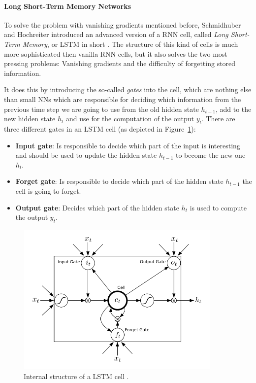 \paragraph{Long Short-Term Memory Networks} To solve the problem with vanishing gradients mentioned before, Schmidhuber and Hochreiter introduced an advanced version of a RNN cell, called \emph{Long Short-Term Memory}, or LSTM in short \cite{Hochreiter:1997}. The structure of this kind of cells is much more sophisticated then vanilla RNN cells, but it also solves the two most pressing problems: Vanishing gradients and the difficulty of forgetting stored information.

It does this by introducing the so-called \emph{gates} into the cell, which are nothing else than small NNs which are responsible for deciding which information from the previous time step we are going to use from the old hidden state $h_{t-1}$, add to the new hidden state $h_t$ and use for the computation of the output $y_t$. There are three different gates in an LSTM cell (as depicted in Figure~\ref{fundamentals:lstm:internal_structure}):

\begin{itemize}
	\item \textbf{Input gate}: Is responsible to decide which part of the input is interesting and should be used to update the hidden state $h_{t-1}$ to become the new one $h_t$.
	\item \textbf{Forget gate}: Is responsible to decide which part of the hidden state $h_{t-1}$ the cell is going to forget.
	\item \textbf{Output gate}: Decides which part of the hidden state $h_t$ is used to compute the output $y_t$.
\end{itemize}

\begin{figure}[h]
	\centering
	\includegraphics[width=10cm]{img/lstm_internal}
	\caption{Internal structure of a LSTM cell \cite{Graves:2013}.}
	\label{fundamentals:lstm:internal_structure}
\end{figure}

